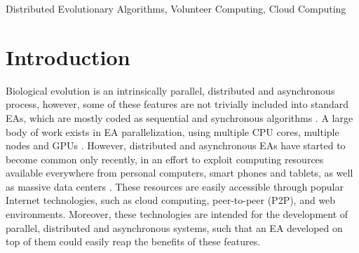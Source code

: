 \documentclass[conference]{IEEEtran}
\begin{document}
\begin{IEEEkeywords}
  Distributed Evolutionary Algorithms, Volunteer Computing,
  Cloud Computing
\end{IEEEkeywords}

\section{Introduction}

Biological evolution is an intrinsically parallel, distributed and asynchronous process, however,
some of these features are not trivially included into standard EAs,  which are mostly coded as sequential
and synchronous algorithms \cite{eiben}.  A large body of work exists in EA parallelization,
using multiple CPU cores, multiple nodes and GPUs \cite{cantu2000efficient,hofmann2013performance}.
However, distributed and asynchronous EAs have started to become common only recently,
in an effort to exploit computing resources available everywhere from personal computers,
smart phones and tablets, as well as massive data centers \cite{agajaj,FlexGP}.
These resources are easily accessible through popular Internet technologies, such as cloud computing,
peer-to-peer (P2P), and web environments. Moreover, these technologies are intended for the development
of parallel, distributed and asynchronous systems, such that an EA developed on top of them could easily
reap the benefits of these features.
\end{document}

